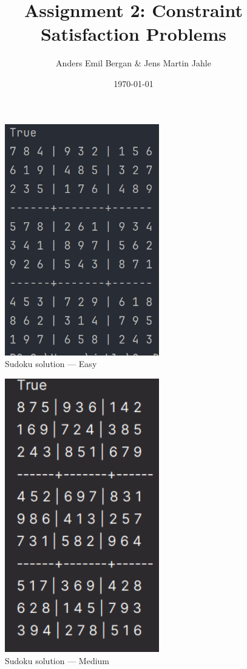 \documentclass[11pt]{article}
\begin{document}
\title{Assignment 2: Constraint Satisfaction Problems}
\author{Anders Emil Bergan \& Jens Martin Jahle}
\date{\today}
\maketitle



\begin{figure}[H]
    \centering
    \includegraphics[width=0.6\textwidth]{images/sudoko_easy}
    \caption{Sudoku solution — Easy}
\end{figure}

\begin{figure}[H]
    \centering
    \includegraphics[width=0.6\textwidth]{images/sudoko_medium}
    \caption{Sudoku solution — Medium}
\end{figure}
\end{document}
